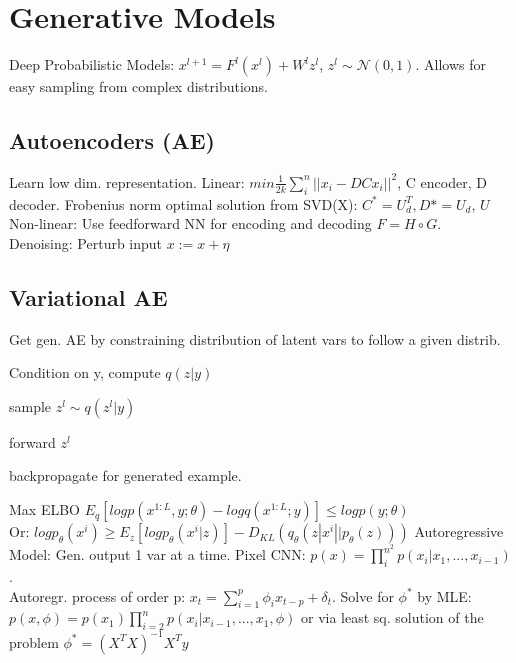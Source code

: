 \section{Generative Models}
Deep Probabilistic Models: $x^{l+1} = F^l(x^l) + W^l z^l$, $z^{l}\sim \mathcal{N}(0,1)$. Allows for easy sampling from complex distributions.
\subsection{Autoencoders (AE)}
Learn low dim. representation. 
Linear: $min \frac{1}{2k} \sum_{i}^n ||x_i - DCx_i||^2$, C encoder, D decoder. Frobenius norm optimal solution from SVD(X): $C^*=U_d^T, D*=U_d$, $U$
Non-linear: Use feedforward NN for encoding and decoding $F = H \circ G$. \\
Denoising: Perturb input $x := x + \eta$
\subsection{Variational AE}
Get gen. AE by constraining distribution of latent vars to follow a given distrib.
\begin{inparaenum}
	\item Condition on y, compute $q(z|y)$
	\item sample $z^l \sim q(z^l|y)$
	\item forward $z^l$
	\item backpropagate for generated example.
\end{inparaenum}
Max ELBO $E_q[log p(x^{1:L},y;\theta) - log q(x^{1:L};y)] \leq log p (y;\theta)$ \\ 
Or: $log p_\theta(x^{i}) \geq E_z[log p_\theta(x^{i}|z)] - D_{KL}(q_\theta(z|x^{i}||p_\theta(z)))$
Autoregressive Model: Gen. output 1 var at a time. 
Pixel CNN: $p(x) = \prod_i^{n^2} p(x_i|x_1,...,x_{i-1})$. \\
Autoregr. process of order p: $x_t = \sum_{i=1}^p \phi_i x_{t-p} + \delta_t$.
Solve for $\phi^*$ by MLE: $p(x, \phi) = p(x_1)\prod_{i=2}^n p(x_i|x_{i-1},...,x_1,\phi)$ or via least sq. solution of the problem $\phi^* = (X^TX)^{-1}X^Ty$